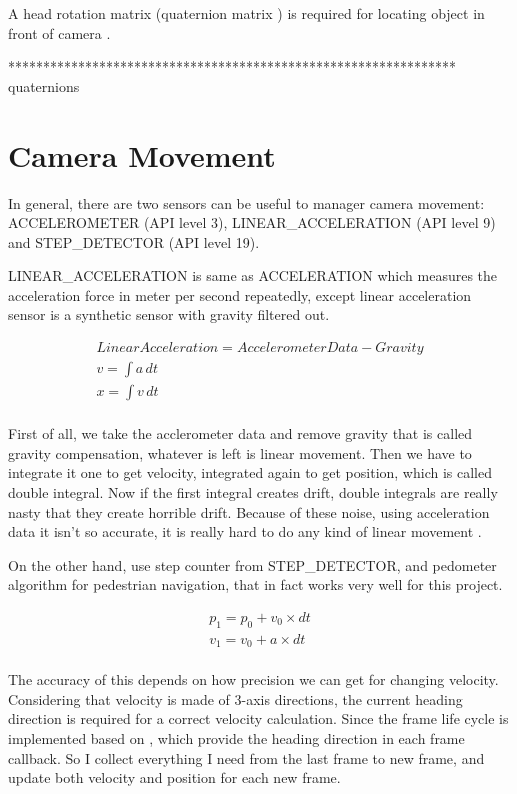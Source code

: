 A head rotation matrix (quaternion matrix \parencite{jvv.quaternions.2013}) is required for locating object in front of camera \parencite{mathworks.quaternion-rotation.2016} .

****************************************************************\\%
quaternions\\

\section{Camera Movement}

In general, there are two sensors can be useful to manager camera movement: ACCELEROMETER (API level 3), LINEAR\_ACCELERATION (API level 9) and STEP\_DETECTOR (API level 19). 

LINEAR\_ACCELERATION is same as ACCELERATION which measures the acceleration force in meter per second repeatedly, except linear acceleration sensor is a synthetic sensor with gravity filtered out. 

\[
\begin{array}{lr}
Linear Acceleration = Accelerometer Data - Gravity\\
v = \int a\,dt\\
x = \int v\,dt\\
\end{array}
\]

First of all, we take the acclerometer data and remove gravity that is called gravity compensation, whatever is left is linear movement. Then we have to integrate it one to get velocity, integrated again to get position, which is called double integral. Now if the first integral creates drift, double integrals are really nasty that they create horrible drift. Because of these noise, using acceleration data it isn't so accurate, it is really hard to do any kind of linear movement \parencite{GoogleTechTalks.sensor-fusion.2010}.

On the other hand, use step counter from STEP\_DETECTOR, and pedometer algorithm for pedestrian navigation, that in fact works very well for this project.

\[
\begin{array}{lr}
p_1 = p_0 + v_0 \times dt\\
v_1 = v_0 + a \times dt\\
\end{array}
\]

The accuracy of this depends on how precision we can get for changing velocity. Considering that velocity is made of 3-axis directions, the current heading direction is required for a correct velocity calculation. Since the frame life cycle is implemented based on \parencite{Google.VR-SDK.2016}, which provide the heading direction in each frame callback. So I collect everything I need from the last frame to new frame, and update both velocity and position for each new frame.

